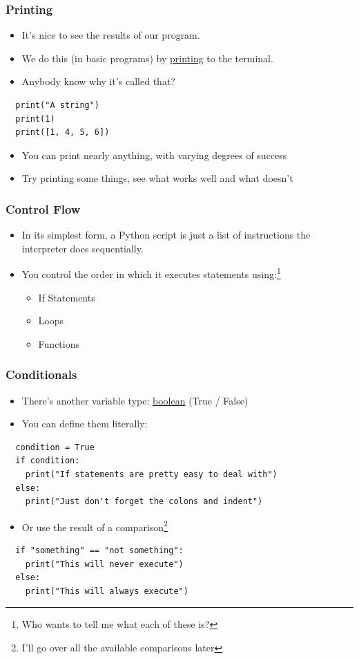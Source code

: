 \documentclass[aspectratio=169]{beamer}
\begin{document}
\begin{frame}[fragile]
  \frametitle{Printing}
  \begin{itemize}
    \item It's nice to see the results of our program.
    \item We do this (in basic programs) by \underline{printing} to the
          terminal.
    \item Anybody know why it's called that?
    \pause
  \end{itemize}
  \begin{verbatim}
  print("A string")
  print(1)
  print([1, 4, 5, 6])
  \end{verbatim}
  \begin{itemize}
    \item You can print nearly anything, with varying degrees of success
    \item Try printing some things, see what works well and what doesn't
  \end{itemize}
\end{frame}
\begin{frame}
  \frametitle{Control Flow}
  \begin{itemize}
    \item In its simplest form, a Python script is just a list of instructions
          the interpreter does sequentially.
    \pause
    \item You control the order in which it executes statements using:\footnote{Who wants to tell me what each of these is?}
    \begin{itemize}
      \item If Statements
      \item Loops
      \item Functions
    \end{itemize}
  \end{itemize}
\end{frame}
\begin{frame}[fragile]
  \frametitle{Conditionals}
  \begin{itemize}
    \item There's another variable type: \underline{boolean} (True / False)
    \item You can define them literally:
  \end{itemize}
  \begin{verbatim}
  condition = True
  if condition:
    print("If statements are pretty easy to deal with")
  else:
    print("Just don't forget the colons and indent")
  \end{verbatim}
  \pause
  \begin{itemize}
    \item Or use the result of a comparison\footnote{I'll go over all the available comparisons later}
  \end{itemize}
  \begin{verbatim}
  if "something" == "not something":
    print("This will never execute")
  else:
    print("This will always execute")
  \end{verbatim}
\end{frame}
\end{document}

